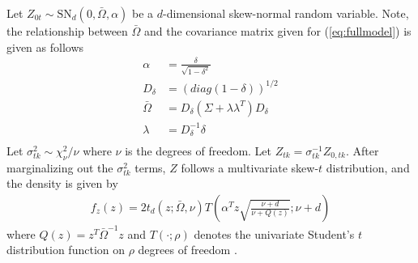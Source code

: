 Let $Z_{0t} \sim \text{SN}_d(0, \bar{\Omega}, \alpha)$ be a $d$-dimensional skew-normal random variable.
Note, the relationship between $\bar{\Omega}$ and the \Matern covariance matrix given for (\ref{eq:fullmodel}) is given as follows
\begin{align*}
  \alpha &= \frac{ \delta }{ \sqrt{1 - \delta^2} } \\
  D_\delta &= (diag(1 - \delta))^{1/2}\\
  \bar{\Omega} &= D_\delta (\Sigma + \lambda \lambda^T) D_\delta \\
  \lambda &= D_\delta^{-1} \delta\\
\end{align*}
Let $\sigma_{tk}^2 \sim \chi^2_\nu / \nu$ where $\nu$ is the degrees of freedom.
Let $Z_{tk} = \sigma_{tk}^{-1} Z_{0, tk}$.
After marginalizing out the $\sigma_{tk}^2$ terms, $Z$ follows a multivariate skew-$t$ distribution, and the density is given by
\begin{align*}
  f_z(z) = 2 t_d(z; \bar{\Omega}, \nu) T \left( \alpha^T z \sqrt{ \frac{\nu + d}{\nu + Q(z)} }; \nu + d\right)
\end{align*}
where $Q(z) = z^T \bar{\Omega}^{-1}z$ and $T(\cdot; \rho)$ denotes the univariate Student's $t$ distribution function on $\rho$ degrees of freedom \citep{Azzalini2013}.